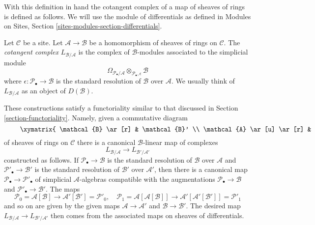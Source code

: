 \noindent
With this definition in hand the cotangent complex of a map of sheaves
of rings is defined as follows.
We will use the module of differentials as defined in
Modules on Sites, Section \ref{sites-modules-section-differentials}.

\begin{definition}
\label{definition-cotangent-complex-morphism-sheaves-rings}
Let $\mathcal{C}$ be a site.
Let $\mathcal{A} \to \mathcal{B}$ be a homomorphism of sheaves of rings
on $\mathcal{C}$.
The {\it cotangent complex} $L_{\mathcal{B}/\mathcal{A}}$
is the complex of $\mathcal{B}$-modules associated to the
simplicial module
$$
\Omega_{\mathcal{P}_\bullet/\mathcal{A}}
\otimes_{\mathcal{P}_\bullet, \epsilon} \mathcal{B}
$$
where $\epsilon : \mathcal{P}_\bullet \to \mathcal{B}$
is the standard resolution of $\mathcal{B}$ over
$\mathcal{A}$. We usually think of $L_{\mathcal{B}/\mathcal{A}}$
as an object of $D(\mathcal{B})$.
\end{definition}

\noindent
These constructions satisfy a functoriality similar to that discussed
in Section \ref{section-functoriality}. Namely, given a commutative diagram
\begin{equation}
\label{equation-commutative-square-sheaves}
\vcenter{
\xymatrix{
\mathcal{B} \ar[r] & \mathcal{B}' \\
\mathcal{A} \ar[u] \ar[r] & \mathcal{A}' \ar[u]
}
}
\end{equation}
of sheaves of rings on $\mathcal{C}$ there is a canonical
$\mathcal{B}$-linear map of complexes
$$
L_{\mathcal{B}/\mathcal{A}} \longrightarrow L_{\mathcal{B}'/\mathcal{A}'}
$$
constructed as follows. If $\mathcal{P}_\bullet \to \mathcal{B}$ is the
standard resolution of $\mathcal{B}$ over $\mathcal{A}$ and
$\mathcal{P}'_\bullet \to \mathcal{B}'$ is the
standard resolution of $\mathcal{B}'$ over $\mathcal{A}'$,
then there is a canonical map $\mathcal{P}_\bullet \to \mathcal{P}'_\bullet$
of simplicial $\mathcal{A}$-algebras compatible with the augmentations
$\mathcal{P}_\bullet \to \mathcal{B}$ and
$\mathcal{P}'_\bullet \to \mathcal{B}'$. The maps
$$
\mathcal{P}_0 = \mathcal{A}[\mathcal{B}]
\longrightarrow
\mathcal{A}'[\mathcal{B}'] = \mathcal{P}'_0,
\quad
\mathcal{P}_1 = \mathcal{A}[\mathcal{A}[\mathcal{B}]]
\longrightarrow
\mathcal{A}'[\mathcal{A}'[\mathcal{B}']] = \mathcal{P}'_1
$$
and so on are given by the given maps $\mathcal{A} \to \mathcal{A}'$
and $\mathcal{B} \to \mathcal{B}'$. The desired map
$L_{\mathcal{B}/\mathcal{A}} \to L_{\mathcal{B}'/\mathcal{A}'}$
then comes from the associated maps on sheaves of differentials.

